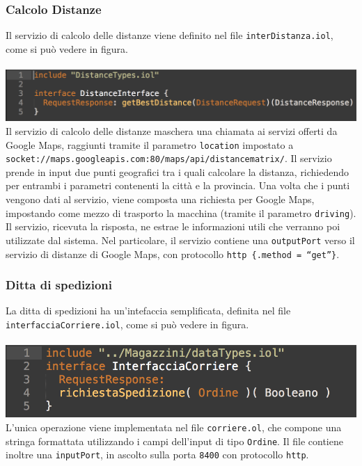 \subsubsection*{Calcolo Distanze}
Il servizio di calcolo delle distanze viene definito nel file
{\tt interDistanza.iol}, come si pu\`o vedere in figura. \\\\
\includegraphics[scale=0.5]{immagini/interfDistanza.png}\\
Il servizio di calcolo delle distanze maschera una chiamata ai servizi
offerti da Google Maps, raggiunti tramite il parametro {\tt location}
impostato a \\
{\tt socket://maps.googleapis.com:80/maps/api/distancematrix/}.
Il servizio prende in input due punti geografici tra i quali calcolare
la distanza, richiedendo per entrambi i parametri contenenti la citt\`a
e la provincia. Una volta che i punti vengono dati al servizio, viene
composta una richiesta per Google Maps, impostando come mezzo di
trasporto la macchina (tramite il parametro {\tt driving}). Il servizio,
ricevuta la risposta, ne estrae le informazioni utili che verranno poi
utilizzate dal sistema.
Nel particolare, il servizio contiene una {\tt outputPort} verso il
servizio di distanze di Google Maps, con protocollo
{\tt http \{.method = ``get''\}}.

\subsubsection*{Ditta di spedizioni}
La ditta di spedizioni ha un'intefaccia semplificata, definita nel file
{\tt interfacciaCorriere.iol}, come si pu\`o vedere in figura. \\\\
\includegraphics[scale=0.5]{immagini/interfCorriere.png}\\
L'unica operazione viene implementata nel file {\tt corriere.ol},
che compone una stringa formattata utilizzando i campi dell'input di
tipo {\tt Ordine}.
Il file contiene inoltre una {\tt inputPort}, in ascolto sulla porta
{\tt 8400} con protocollo {\tt http}.

